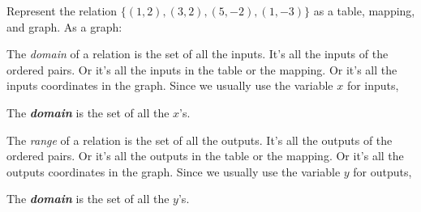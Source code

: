 \documentclass[fleqn,letterpaper,12pt,printwatermark=false]{memoir}
\begin{document}
\begin{myLesson}[][1]
\begin{myWorkedExample}{
            Represent the relation
            \(
                \{ (1,2), (3,2), (5,-2), (1,-3) \}
            \)
            as a table, mapping, and graph.
        }
        As a graph:

        \begin{center}
        \end{center}
    \end{myWorkedExample}

    The \emph{domain} of a relation is the set of all the inputs.
    It's all the inputs of the ordered pairs.
    Or it's all the inputs in the table or the mapping.
    Or it's all the inputs coordinates in the graph.
    Since we usually use the variable $x$ for inputs,
    \begin{myLessonBox}[3in]
        The {\bfseries\itshape domain} is the set of all the $x$'s.
    \end{myLessonBox}

    The \emph{range} of a relation is the set of all the outputs.
    It's all the outputs of the ordered pairs.
    Or it's all the outputs in the table or the mapping.
    Or it's all the outputs coordinates in the graph.
    Since we usually use the variable $y$ for outputs,
    \begin{myLessonBox}[3in]
        The {\bfseries\itshape domain} is the set of all the $y$'s.
    \end{myLessonBox}
\end{myLesson}
\end{document}
